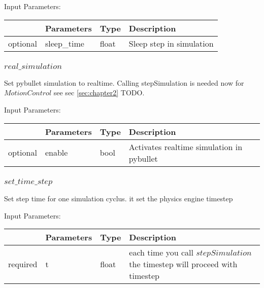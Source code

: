 \documentclass[
	ngerman,
	accentcolor=9c,%
	type=intern,
	marginpar=false
	]{tudapub}
\begin{document}
\vspace{0.5cm}
\noindent Input Parameters:
\vspace{0.5cm}

\begin{tabular}{|p{}|p{}|p{}| p{}|}
\hline
 & \textbf{Parameters} & \textbf{Type} & \textbf{Description} \\
\hline
optional & sleep\_time & float & Sleep step in simulation\\
\hline
\end{tabular}
\vspace{0.5cm}

\subsubsection{$real\_simulation$}
\noindent Set pybullet simulation to realtime. Calling stepSimulation is needed now for $MotionControl$ see sec \ref{sec:chapter2} TODO. 


\vspace{0.5cm}
\noindent Input Parameters:
\vspace{0.5cm}

\begin{tabular}{|p{}|p{}|p{}| p{}|}
\hline
 & \textbf{Parameters} & \textbf{Type} & \textbf{Description} \\
\hline
optional & enable & bool & Activates realtime simulation in pybullet\\
\hline
\end{tabular}
\vspace{0.5cm}


\subsubsection{$set\_time\_step$}
\noindent Set step time for one simulation cyclus. it set the physics engine timestep


\vspace{0.5cm}
\noindent Input Parameters:
\vspace{0.5cm}

\begin{tabular}{|p{}|p{}|p{}| p{}|}
\hline
 & \textbf{Parameters} & \textbf{Type} & \textbf{Description} \\
\hline
required & t & float & each time you call $stepSimulation$ the timestep will proceed with timestep\\
\hline
\end{tabular}
\vspace{0.5cm}
\end{document}
